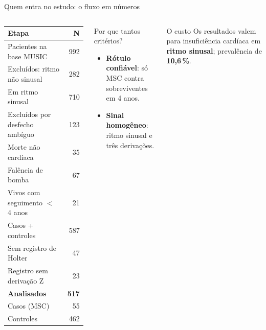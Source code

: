 \documentclass[10pt,aspectratio=169]{beamer}
\begin{document}
\begin{frame}{Quem entra no estudo: o fluxo em números}
  \begin{columns}[c]
    \centering
    \footnotesize
    \begin{tabular}{lr}
      \toprule
      \textbf{Etapa} & \textbf{N} \\
      \midrule
      Pacientes na base MUSIC                       & 992 \\
      \quad Excluídos: ritmo não sinusal            & 282 \\
      Em ritmo sinusal                              & 710 \\
      \quad Excluídos por desfecho ambíguo          & 123 \\
      \qquad Morte não cardíaca                     & 35  \\
      \qquad Falência de bomba                      & 67  \\
      \qquad Vivos com seguimento $<$ 4 anos        & 21  \\
      Casos + controles                             & 587 \\
      \quad Sem registro de Holter                  & 47  \\
      \quad Registro sem derivação Z                & 23  \\
      \midrule
      \textbf{Analisados}                           & \textbf{517} \\
      \quad Casos (MSC)                             & 55  \\
      \quad Controles                               & 462 \\
      \bottomrule
    \end{tabular}
    \begin{block}{Por que tantos critérios?}
      \small
      \begin{itemize}
        \item \textbf{Rótulo confiável}: só MSC contra sobreviventes em 4 anos.
        \item \textbf{Sinal homogêneo}: ritmo sinusal e três derivações.
      \end{itemize}
    \end{block}
    \begin{block}{O custo}
      \small Os resultados valem para insuficiência cardíaca em
      \textbf{ritmo sinusal}; prevalência de \textbf{10,6\,\%}.
    \end{block}
  \end{columns}
\end{frame}
\end{document}
